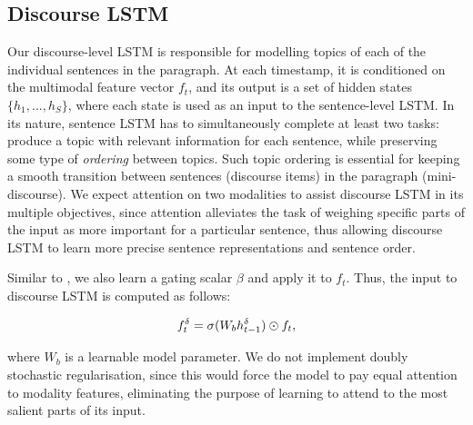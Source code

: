 \documentclass[11pt,a4paper]{article}
\begin{document}
\subsection{Discourse LSTM}
Our discourse-level LSTM is responsible for modelling topics of each of the individual sentences in the paragraph.
At each timestamp, it is conditioned on the multimodal feature vector $f_t$, and its output is a set of hidden states $\{h_1, ..., h_S\}$, where each state is used as an input to the sentence-level LSTM.
In its nature, sentence LSTM has to simultaneously complete at least two tasks: produce a topic with relevant information for each sentence, while preserving some type of \textit{ordering} between topics.
Such topic ordering is essential for keeping a smooth transition between sentences (discourse items) in the paragraph (mini-discourse).
We expect attention on two modalities to assist discourse LSTM in its multiple objectives, since attention alleviates the task of weighing specific parts of the input as more important for a particular sentence, thus allowing discourse LSTM to learn more precise sentence representations and sentence order.

Similar to , we also learn a gating scalar $\beta$ and apply it to $f_t$.
Thus, the input to discourse LSTM is computed as follows:

\begin{equation}
	f_t\sp\delta = \sigma(W_b h\sp{\delta}_{t-1}) \odot f_t,
\end{equation}

where $W_b$ is a learnable model parameter.
We do not implement doubly stochastic regularisation, since this would force the model to pay equal attention to modality features, eliminating the purpose of learning to attend to the most salient parts of its input.
\end{document}
